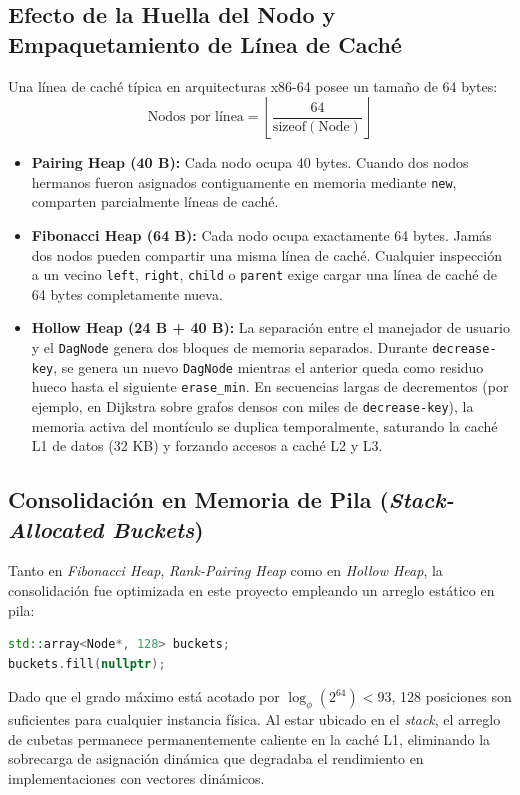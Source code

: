 \documentclass[11pt,a4paper]{article}
\begin{document}
\subsection{Efecto de la Huella del Nodo y Empaquetamiento de Línea de Caché}
Una línea de caché típica en arquitecturas x86-64 posee un tamaño de 64 bytes:
\begin{equation}
    \text{Nodos por línea} = \left\lfloor \frac{64}{\text{sizeof}(\text{Node})} \right\rfloor
\end{equation}
\begin{itemize}
    \item \textbf{Pairing Heap (40 B):} Cada nodo ocupa 40 bytes. Cuando dos nodos hermanos fueron asignados contiguamente en memoria mediante \texttt{new}, comparten parcialmente líneas de caché.
    \item \textbf{Fibonacci Heap (64 B):} Cada nodo ocupa exactamente 64 bytes. Jamás dos nodos pueden compartir una misma línea de caché. Cualquier inspección a un vecino \texttt{left}, \texttt{right}, \texttt{child} o \texttt{parent} exige cargar una línea de caché de 64 bytes completamente nueva.
    \item \textbf{Hollow Heap (24 B + 40 B):} La separación entre el manejador de usuario y el \texttt{DagNode} genera dos bloques de memoria separados. Durante \texttt{decrease-key}, se genera un nuevo \texttt{DagNode} mientras el anterior queda como residuo hueco hasta el siguiente \texttt{erase\_min}. En secuencias largas de decrementos (por ejemplo, en Dijkstra sobre grafos densos con miles de \texttt{decrease-key}), la memoria activa del montículo se duplica temporalmente, saturando la caché L1 de datos (32 KB) y forzando accesos a caché L2 y L3.
\end{itemize}

\subsection{Consolidación en Memoria de Pila (\textit{Stack-Allocated Buckets})}
Tanto en \textit{Fibonacci Heap}, \textit{Rank-Pairing Heap} como en \textit{Hollow Heap}, la consolidación fue optimizada en este proyecto empleando un arreglo estático en pila:
\begin{lstlisting}[language=C++]
std::array<Node*, 128> buckets;
buckets.fill(nullptr);
\end{lstlisting}
Dado que el grado máximo está acotado por $\log_\phi(2^{64}) < 93$, 128 posiciones son suficientes para cualquier instancia física. Al estar ubicado en el \textit{stack}, el arreglo de cubetas permanece permanentemente caliente en la caché L1, eliminando la sobrecarga de asignación dinámica que degradaba el rendimiento en implementaciones con vectores dinámicos.
\end{document}
